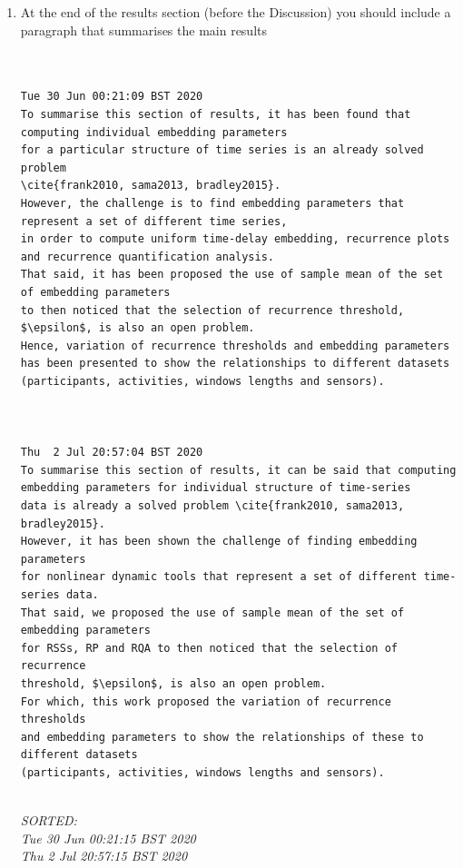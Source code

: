 \documentclass[10pt]{article}
\begin{document}
\begin{enumerate}


\item 

At the end of the results section (before the Discussion) you should include a paragraph that summarises the main results
	\begin{verbatim}


Tue 30 Jun 00:21:09 BST 2020
To summarise this section of results, it has been found that computing individual embedding parameters 
for a particular structure of time series is an already solved problem
\cite{frank2010, sama2013, bradley2015}.
However, the challenge is to find embedding parameters that represent a set of different time series,
in order to compute uniform time-delay embedding, recurrence plots and recurrence quantification analysis.
That said, it has been proposed the use of sample mean of the set of embedding parameters
to then noticed that the selection of recurrence threshold, $\epsilon$, is also an open problem.
Hence, variation of recurrence thresholds and embedding parameters 
has been presented to show the relationships to different datasets 
(participants, activities, windows lengths and sensors).



Thu  2 Jul 20:57:04 BST 2020
To summarise this section of results, it can be said that computing
embedding parameters for individual structure of time-series 
data is already a solved problem \cite{frank2010, sama2013, bradley2015}. 
However, it has been shown the challenge of finding embedding parameters 
for nonlinear dynamic tools that represent a set of different time-series data.
That said, we proposed the use of sample mean of the set of embedding parameters
for RSSs, RP and RQA to then noticed that the selection of recurrence 
threshold, $\epsilon$, is also an open problem.
For which, this work proposed the variation of recurrence thresholds 
and embedding parameters to show the relationships of these to different datasets 
(participants, activities, windows lengths and sensors).


	\end{verbatim}
	\textit{
	SORTED: \\ 
Tue 30 Jun 00:21:15 BST 2020 \\
Thu  2 Jul 20:57:15 BST 2020\\
	}
	\\


\end{enumerate}
\end{document}
